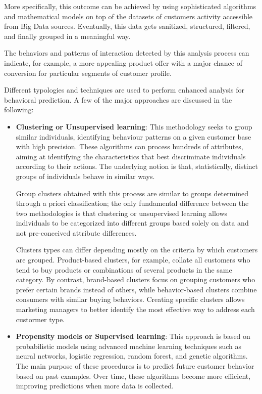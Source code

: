 \pagebreak

More specifically, this outcome can be achieved by using sophisticated algorithms and mathematical models on top of the datasets of customers activity accessible from Big Data sources. Eventually, this data gets sanitized, structured, filtered, and finally grouped in a meaningful way. 

The behaviors and patterns of interaction detected by this analysis process can indicate, for example, a more appealing product offer with a major chance of conversion for particular segments of customer profile.

Different typologies and techniques are used to perform enhanced analysis for behavioral prediction. A few of the major approaches are discussed in the following:

\begin{itemize}
    \item \textbf{Clustering or Unsupervised learning}: This methodology seeks to group similar individuals, identifying behaviour patterns on a given customer base with high precision. These algorithms can process hundreds of attributes, aiming at identifying the characteristics that best discriminate individuals according to their actions. The underlying notion is that, statistically, distinct groups of individuals behave in similar ways. 
    
    Group clusters obtained with this process are similar to groups determined through a priori classification; the only fundamental difference between the two methodologies is that clustering or unsupervised learning allows individuals to be categorized into different groups based solely on data and not pre-conceived attribute differences. 
    
    Clusters types can differ depending mostly on the criteria by which customers are grouped. Product-based clusters, for example, collate all customers who tend to buy products or combinations of several products in the same category. By contrast, brand-based clusters focus on grouping customers who prefer certain brands instead of others, while behavior-based clusters combine consumers with similar buying behaviors. Creating specific clusters allows marketing managers to better identify the most effective way to address each custormer type.

    \item \textbf{Propensity models or Supervised learning}: This approach is based on probabilistic models using advanced machine learning techniques such as neural networks, logistic regression, random forest, and genetic algorithms. The main purpose of these procedures is to predict future customer behavior based on past examples. Over time, these algorithms become more efficient, improving predictions when more data is collected.


\end{itemize}
